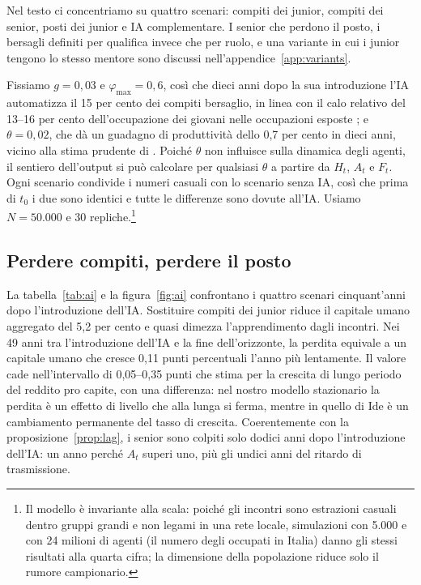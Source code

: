 \documentclass[preprint,12pt,authoryear]{elsarticle}
\begin{document}
Nel testo ci concentriamo su quattro scenari: compiti dei junior, compiti dei senior, posti dei junior e IA complementare. I senior che perdono il posto, i bersagli definiti per qualifica invece che per ruolo, e una variante in cui i junior tengono lo stesso mentore sono discussi nell'appendice~\ref{app:variants}.

Fissiamo $g=0{,}03$ e $\varphi_{\max}=0{,}6$, così che dieci anni dopo la sua introduzione l'IA automatizza il 15 per cento dei compiti bersaglio, in linea con il calo relativo del 13--16 per cento dell'occupazione dei giovani nelle occupazioni esposte \citep{Brynjolfsson2025}; e $\theta=0{,}02$, che dà un guadagno di produttività dello 0,7 per cento in dieci anni, vicino alla stima prudente di \citet{Acemoglu2024}. Poiché $\theta$ non influisce sulla dinamica degli agenti, il sentiero dell'output si può calcolare per qualsiasi $\theta$ a partire da $H_t$, $A_t$ e $F_t$. Ogni scenario condivide i numeri casuali con lo scenario senza IA, così che prima di $t_0$ i due sono identici e tutte le differenze sono dovute all'IA. Usiamo $N=50.000$ e 30 repliche.\footnote{Il modello è invariante alla scala: poiché gli incontri sono estrazioni casuali dentro gruppi grandi e non legami in una rete locale, simulazioni con 5.000 e con 24 milioni di agenti (il numero degli occupati in Italia) danno gli stessi risultati alla quarta cifra; la dimensione della popolazione riduce solo il rumore campionario.}

\subsection{Perdere compiti, perdere il posto}

La tabella~\ref{tab:ai} e la figura~\ref{fig:ai} confrontano i quattro scenari cinquant'anni dopo l'introduzione dell'IA. Sostituire compiti dei junior riduce il capitale umano aggregato del 5,2 per cento e quasi dimezza l'apprendimento dagli incontri. Nei 49 anni tra l'introduzione dell'IA e la fine dell'orizzonte, la perdita equivale a un capitale umano che cresce 0,11 punti percentuali l'anno più lentamente. Il valore cade nell'intervallo di 0,05--0,35 punti che \citet{Ide2026} stima per la crescita di lungo periodo del reddito pro capite, con una differenza: nel nostro modello stazionario la perdita è un effetto di livello che alla lunga si ferma, mentre in quello di Ide è un cambiamento permanente del tasso di crescita. Coerentemente con la proposizione~\ref{prop:lag}, i senior sono colpiti solo dodici anni dopo l'introduzione dell'IA: un anno perché $A_t$ superi uno, più gli undici anni del ritardo di trasmissione.
\end{document}
